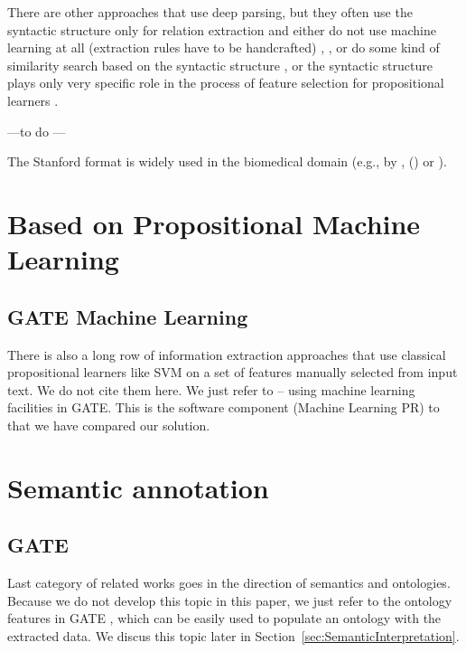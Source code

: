 There are other approaches that use deep parsing, but they often use the syntactic structure only for relation extraction and either do not use machine learning at all (extraction rules have to be handcrafted) 
\citep{Yakushiji2001},
\citep{RelEx},
\citep{Buyko:dependencyGraphs}
or do some kind of similarity search based on the syntactic structure
\citep{Etzioni08informationExtraction},
\citep{Wang:SimilarityTreeSkeletons}
or the syntactic structure plays only very specific role in the process of feature selection for propositional learners %
\citep{Bunescu:DependencyPaths}.

---to do ---

The
Stanford format is widely used in the biomedical
domain (e.g., by \cite{MiyaoACL2008}, (\cite{Yakushiji2001}) or
\cite{Clegg2005Evaluating}).


\section{Based on Propositional Machine Learning}
\subsection{GATE Machine Learning}
There is also a long row of information extraction approaches that use classical propositional learners like SVM on a set of features manually selected from input text. We do not cite them here. We just refer to \citep{Yaoyong09a} -- using machine learning facilities in GATE. This is the software component (Machine Learning PR) to that we have compared our solution. 

\section{Semantic annotation}
\subsection{GATE}
Last category of related works goes in the direction of semantics and ontologies. Because we do not develop this topic in this paper, we just refer to the ontology features in GATE \citep{Bon04b}, which can be easily used to populate an ontology with the extracted data. We discus this topic later in Section~\ref{sec:SemanticInterpretation}.

